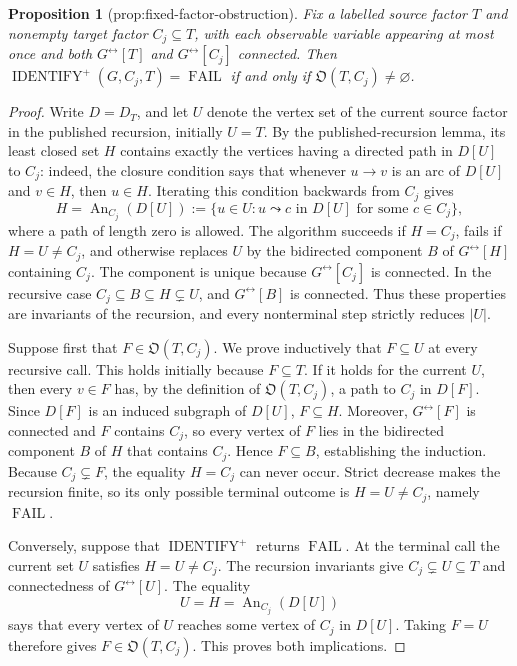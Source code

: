 \documentclass{article}
\newtheorem{proposition}{Proposition}
\begin{document}
\begin{proposition}[prop:fixed-factor-obstruction]\label{prop:fixed-factor-obstruction}
Fix a labelled source factor \(T\) and nonempty target factor \(C_j\subseteq T\), with each observable variable appearing at most once and both \(G^{\leftrightarrow}[T]\) and \(G^{\leftrightarrow}[C_j]\) connected. Then \(\operatorname{IDENTIFY}^{+}(G,C_j,T)=\operatorname{FAIL}\) if and only if \(\mathfrak O(T,C_j)\neq\varnothing\).
\end{proposition}
\begin{proof}
Write \(D=D_T\), and let \(U\) denote the vertex set of the current source factor in the published recursion, initially \(U=T\).  By the published-recursion lemma, its least closed set \(H\) contains exactly the vertices having a directed path in \(D[U]\) to \(C_j\): indeed, the closure condition says that whenever \(u\to v\) is an arc of \(D[U]\) and \(v\in H\), then \(u\in H\).  Iterating this condition backwards from \(C_j\) gives
\[
 H=\operatorname{An}_{C_j}(D[U])
   :=\{u\in U:u\leadsto c\text{ in }D[U]\text{ for some }c\in C_j\},
\]
where a path of length zero is allowed.  The algorithm succeeds if \(H=C_j\), fails if \(H=U\ne C_j\), and otherwise replaces \(U\) by the bidirected component \(B\) of \(G^{\leftrightarrow}[H]\) containing \(C_j\).  The component is unique because \(G^{\leftrightarrow}[C_j]\) is connected.  In the recursive case \(C_j\subseteq B\subseteq H\subsetneq U\), and \(G^{\leftrightarrow}[B]\) is connected.  Thus these properties are invariants of the recursion, and every nonterminal step strictly reduces \(|U|\).

Suppose first that \(F\in\mathfrak O(T,C_j)\).  We prove inductively that \(F\subseteq U\) at every recursive call.  This holds initially because \(F\subseteq T\).  If it holds for the current \(U\), then every \(v\in F\) has, by the definition of \(\mathfrak O(T,C_j)\), a path to \(C_j\) in \(D[F]\).  Since \(D[F]\) is an induced subgraph of \(D[U]\), \(F\subseteq H\).  Moreover, \(G^{\leftrightarrow}[F]\) is connected and \(F\) contains \(C_j\), so every vertex of \(F\) lies in the bidirected component \(B\) of \(H\) that contains \(C_j\).  Hence \(F\subseteq B\), establishing the induction.  Because \(C_j\subsetneq F\), the equality \(H=C_j\) can never occur.  Strict decrease makes the recursion finite, so its only possible terminal outcome is \(H=U\ne C_j\), namely \(\operatorname{FAIL}\).

Conversely, suppose that \(\operatorname{IDENTIFY}^{+}\) returns \(\operatorname{FAIL}\).  At the terminal call the current set \(U\) satisfies \(H=U\ne C_j\).  The recursion invariants give \(C_j\subsetneq U\subseteq T\) and connectedness of \(G^{\leftrightarrow}[U]\).  The equality
\[
 U=H=\operatorname{An}_{C_j}(D[U])
\]
says that every vertex of \(U\) reaches some vertex of \(C_j\) in \(D[U]\).  Taking \(F=U\) therefore gives \(F\in\mathfrak O(T,C_j)\).  This proves both implications.
\end{proof}
\end{document}
